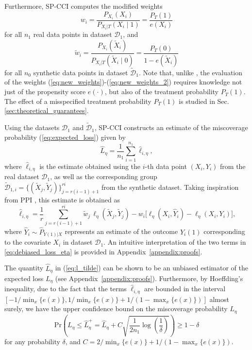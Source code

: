 \documentclass{article}
\theoremstyle{plain}
\theoremstyle{definition}
\theoremstyle{remark}
\begin{document}
Furthermore, SP-CCI computes the modified weights
\begin{equation}
\label{eq:new_weights}
w_i = \frac{P_{X_i}( X_i)}{P_{X_i|T}(X_i \mid 1)} = \frac{P_T( 1)}{e(X_i)}
\end{equation}
for all $n_1$ real data points in dataset $\mathcal{D}_1$, and
\begin{equation}
\label{eq:new_weights_2}
\tilde{w}_i = \frac{P_{X_i}( \tilde{X}_i)}{P_{X_i|T}(\tilde{X}_i \mid 0)} = \frac{P_T( 0)}{1-e(\tilde{X}_i)}
\end{equation}
for all $n_0$ synthetic data points in dataset $\tilde{\mathcal{D}}_1$. Note that, unlike \citep{lei2021conformal}, the evaluation of the weights (\ref{eq:new_weights})-(\ref{eq:new_weights_2}) requires knowledge not just of the propensity score $e(\cdot)$, but also of the treatment probability $P_T ( 1)$. The effect of a misspecified treatment probability $P_T ( 1)$ is studied in Sec. \ref{sec:theoretical_guarantees}.


Using the datasets $\mathcal{D}_1$ and $\tilde{\mathcal{D}}_1$, SP-CCI constructs an estimate of the miscoverage probability (\ref{eq:expected_loss}) given by
\begin{equation}
\label{eq:l_tilde}
    \hat{L}_\eta = \frac{1}{n_1} \sum_{i=1}^{n_1} \hat{\ell}_{i,\eta},
\end{equation}
where $\hat{\ell}_{i,\eta}$ is the estimate obtained using the $i$-th data point $(X_i, Y_i)$ from the real dataset $\mathcal{D}_1$, as well as the corresponding group $\tilde{\mathcal{D}}_{1, i}= \{(\tilde{X}_j, \tilde{Y}_j)\}_{j = r(i-1)+1}^{ri}$ from the synthetic dataset. Taking inspiration from PPI \citep{angelopoulos2023prediction, einbinder2024semi, park2025adaptive}, this estimate is obtained as
\begin{equation}
\label{eq:debiased_loss_eta}
\hat{\ell}_{i,\eta}
= \frac{1}{r} \sum_{j = r(i-1)+1}^{ri}
    \tilde{w}_j \,\ell_\eta(\tilde{X}_j, \tilde{Y}_j) - w_i \Big[ \ell_\eta(X_i, \hat{Y}_i) - \ell_\eta(X_i, Y_i) \Big],
\end{equation}
where $\hat{Y}_i\sim \hat{P}_{Y(1)|X}$ represents an estimate of the outcome $Y_i(1)$ corresponding to the covariate $X_i$ in dataset $\mathcal{D}_1$. An intuitive interpretation of the two terms in \eqref{eq:debiased_loss_eta} is provided in Appendix~\ref{appendix:proofs}.



The quantity \( \hat{L}_\eta \) in (\ref{eq:l_tilde}) can be shown to be an unbiased estimator of the expected loss $L_\eta$ (see Appendix~\ref{appendix:proofs}). Furthermore, by Hoeffding's inequality, due to the fact that the terms $\hat{\ell}_{i, \eta}$ are bounded in the interval $[-1/\min_x\{e(x)\},1/\min_x\{e(x)\} + 1/(1-\max_x\{e(x)\}) ]$ almost surely, we have the upper confidence bound on the miscoverage probability $L_\eta$ \citep{bates2021distribution}
\begin{equation}
\label{eq:Hoeffding}
    \mathrm{Pr} \left( L_\eta \leq \hat{L}_\eta^+ = \hat{L}_\eta + C\sqrt{\frac{1}{2n_1} \log\left(\frac{1}{\delta}\right)} \right) \geq 1 - \delta
\end{equation}
for any probability $\delta$, and $C =2/\min_x\{e(x)\} + 1/(1-\max_x\{e(x)\}) $.
\end{document}
